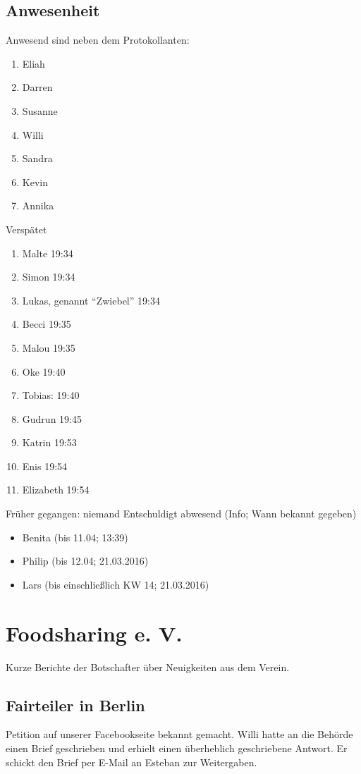 \documentclass{scrreprt}
\begin{document}
\section{Anwesenheit}
Anwesend sind neben dem Protokollanten:
\begin{enumerate}
\item Eliah
\item Darren
\item Susanne
\item Willi
\item Sandra
\item Kevin
\item Annika
\end{enumerate}
Verspätet
\begin{enumerate}[resume]
\item Malte 19:34
\item Simon 19:34
\item Lukas, genannt \enquote{Zwiebel} 19:34
\item Becci 19:35
\item Malou 19:35
\item Oke 19:40
\item Tobias: 19:40
\item Gudrun 19:45
\item Katrin 19:53
\item Enis 19:54
\item Elizabeth 19:54
\end{enumerate}
Früher gegangen: niemand
Entschuldigt abwesend (Info; Wann bekannt gegeben)
\begin{itemize}
\item Benita (bis 11.04; 13:39)
\item Philip (bis 12.04; 21.03.2016)
\item Lars (bis einschließlich KW 14; 21.03.2016)
\end{itemize}

\chapter{Foodsharing e. V.}
Kurze Berichte der Botschafter über Neuigkeiten aus dem Verein. 
\section{Fairteiler in Berlin}
Petition auf unserer Facebookseite bekannt gemacht. Willi hatte an die Behörde einen Brief geschrieben und erhielt einen überheblich geschriebene Antwort. Er schickt den Brief per E-Mail an Esteban zur Weitergaben.
\end{document}
